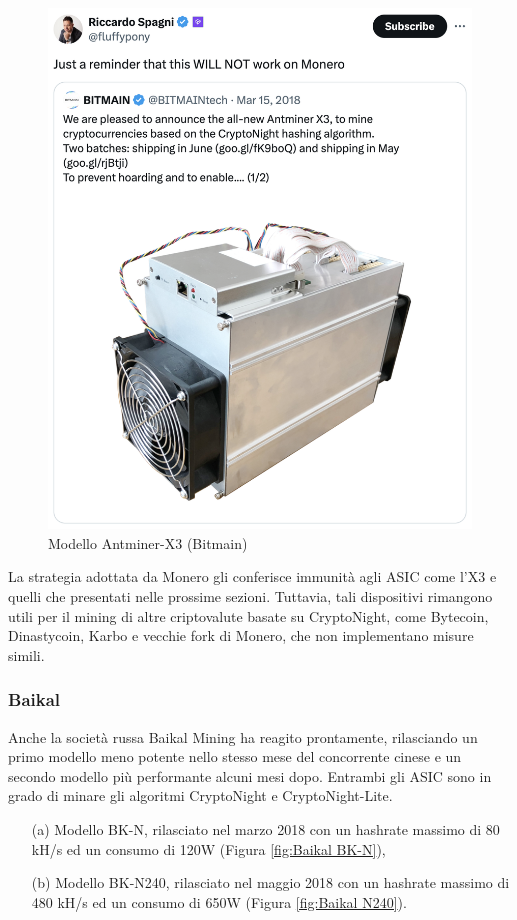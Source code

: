 \begin{figure}[h!]
    \centering
    \includegraphics[width=0.45\linewidth]{images/Antminer-X3.png}
    \caption{Modello Antminer-X3 (Bitmain)}
    \label{fig:Antminer-X3}
\end{figure}

La strategia adottata da Monero gli conferisce immunità agli ASIC come l'X3 e quelli che presentati nelle prossime sezioni. 
Tuttavia, tali dispositivi rimangono utili per il mining di altre criptovalute basate su CryptoNight, come Bytecoin, Dinastycoin, Karbo e vecchie fork di Monero, che non implementano misure simili.



\subsubsection{Baikal}
Anche la società russa Baikal Mining ha reagito prontamente, rilasciando un primo modello meno potente nello stesso mese del concorrente cinese e un secondo modello più performante alcuni mesi dopo.
Entrambi gli ASIC sono in grado di minare gli algoritmi CryptoNight e CryptoNight-Lite.

\begin{itemize}
    \item[(a)] Modello BK-N, rilasciato nel marzo 2018 con un hashrate massimo di 80 kH/s ed un consumo di 120W (Figura \ref{fig:Baikal BK-N}),
    \item[(b)] Modello BK-N240, rilasciato nel maggio 2018 con un hashrate massimo di 480 kH/s ed un consumo di 650W (Figura \ref{fig:Baikal N240}).
\end{itemize}

